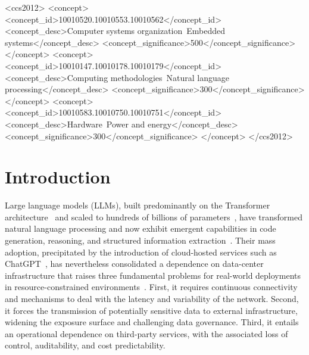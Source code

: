 \documentclass[acmsmall,natbib=false]{acmart}
\begin{document}
\begin{CCSXML}
<ccs2012>
 <concept>
  <concept_id>10010520.10010553.10010562</concept_id>
  <concept_desc>Computer systems organization~Embedded systems</concept_desc>
  <concept_significance>500</concept_significance>
 </concept>
 <concept>
  <concept_id>10010147.10010178.10010179</concept_id>
  <concept_desc>Computing methodologies~Natural language processing</concept_desc>
  <concept_significance>300</concept_significance>
 </concept>
 <concept>
  <concept_id>10010583.10010750.10010751</concept_id>
  <concept_desc>Hardware~Power and energy</concept_desc>
  <concept_significance>300</concept_significance>
 </concept>
</ccs2012>
\end{CCSXML}



\maketitle

\section{Introduction}\label{sec:introduction}

Large language models (LLMs), built predominantly on the Transformer
architecture~\cite{vaswani_attention_2023} and scaled to hundreds of billions
of parameters~\cite{kaplan_scaling_2020,brown_language_2020}, have transformed
natural language processing and now exhibit emergent capabilities in code
generation, reasoning, and structured information
extraction~\cite{wei2022tmlr-emergent}. Their mass adoption, precipitated by the
introduction of cloud-hosted services such as ChatGPT~\cite{hu_chatgpt_2023},
has nevertheless consolidated a dependence on data-center infrastructure that
raises three fundamental problems for real-world deployments in
resource-constrained environments~\cite{friha_llm-based_2024}. First, it
requires continuous connectivity and mechanisms to deal with the latency and variability of the
network. Second, it forces the transmission of potentially sensitive data to
external infrastructure, widening the exposure surface and challenging data
governance. Third, it entails an operational dependence on third-party
services, with the associated loss of control, auditability, and cost
predictability.
\end{document}
